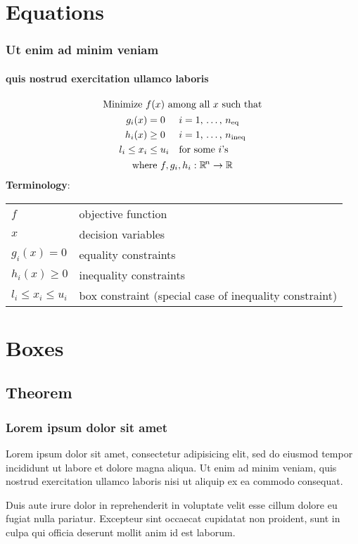 \documentclass[trans]{beamer}
\begin{document}
\section{Equations}
\begin{frame}
	\frametitle{Ut enim ad minim veniam}
	\framesubtitle{quis nostrud exercitation ullamco laboris}

	\begin{equation*}
		\begin{gathered}
			\text{Minimize $f(x)$ among all $x$ such that} \\
			\begin{aligned}
				g_i(x) &= 0	&&\text{$i = 1$, \dots, $n_\text{eq}$}\\
				h_i(x) &\geq 0	&&\text{$i = 1$, \dots, $n_\text{ineq}$}\\
				l_i \leq x_i &\leq u_i &&\text{for some $i$'s}
			\end{aligned} \\
			\text{where $f, g_i, h_i:\mathbb{R}^{\!n}\rightarrow\mathbb{R}$}
		\end{gathered}
	\end{equation*}
	\medskip
	\textbf{Terminology}:
	\begin{tabular}{ll}
		$f$ & objective function\\
		$x$ & decision variables\\
		$g_i(x)= 0$	 & equality constraints\\
		$h_i(x)\geq 0$ & inequality constraints\\
		$l_i \leq x_i \leq u_i$		& box constraint (special case of inequality constraint)\\
	\end{tabular}
\end{frame}

\section{Boxes}
\subsection{Theorem}
\begin{frame}
	\frametitle{Lorem ipsum dolor sit amet}

	Lorem \alert{ipsum dolor sit amet}, consectetur adipisicing elit, sed do eiusmod \alert{tempor incididunt ut labore} et dolore magna aliqua. Ut enim ad minim veniam, \alert{quis nostrud exercitation ullamco laboris} nisi ut aliquip ex ea commodo consequat. 
	\medskip
	\begin{theorem}
		Duis aute irure \alert{dolor in reprehenderit in voluptate} velit esse cillum dolore eu fugiat nulla pariatur. Excepteur sint occaecat cupidatat non proident, sunt in culpa qui officia deserunt mollit anim id est laborum.
	\end{theorem}
\end{frame}
\end{document}
